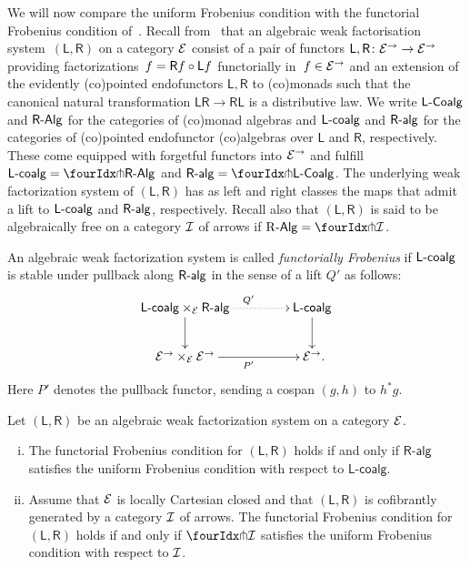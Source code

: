 \documentclass[reqno,10pt,a4paper,oneside,draft]{amsart}
\begin{document}
{
\newcommand{\LL}{\mathsf{L}}
\newcommand{\RR}{\mathsf{R}}

We will now compare the uniform Frobenius condition with the functorial Frobenius condition of~\cite{garner:topological-simplicial}.
Recall from~\cite{bourke-garner-I} that an algebraic weak factorisation system~$(\LL, \RR)$ on a category $\cal{E}$ consist of a pair of functors $\LL, \RR \co \cal{E}^\to \to \cal{E}^\to$ providing factorizations~$f = \RR f \cc \LL f$ functorially in~$f \in \cal{E}^\to$ and an extension of the evidently (co)pointed endofunctors $\LL, \RR$ to (co)monads such that the canonical natural transformation $\LL \RR \to \RR \LL$ is a distributive law.
We write $\pCoalg{\LL}$ and $\pAlg{\RR}$ for the categories of (co)monad algebras and $\pcoalg{\LL}$ and $\palg{\RR}$ for the categories of (co)pointed endofunctor (co)algebras over $\LL$ and $\RR$, respectively.
These come equipped with forgetful functors into $\cal{E}^\to$ and fulfill $\pcoalg{\LL} = \liftl{\pAlg{\RR}}$ and $\palg{\RR} = \liftr{\pCoalg{\LL}}$.
The underlying weak factorization system of $(\LL, \RR)$ has as left and right classes the maps that admit a lift to $\pcoalg{\LL}$ and $\palg{\RR}$, respectively.
Recall also that $(\LL, \RR)$ is said to be algebraically free on a category $\cal{I}$ of arrows if $\pAlg{\R} = \liftr{\cal{I}}$.

\begin{definition} \label{functorial-frobenius}
An algebraic weak factorization system is called \emph{functorially Frobenius} if $\pcoalg{\LL}$ is stable under pullback along $\palg{\RR}$ in the sense of a lift $Q'$ as follows:
\[
\xymatrix@C+2em{
  \pcoalg{\LL} \times_{\cal{E}} \palg{\RR}
  \ar@{.>}[r]^{Q'}
  \ar[d]
&
  \pcoalg{\LL}
  \ar[d]
\\
  \cal{E}^\to \times_{\cal{E}} \cal{E}^\to
  \ar[r]_{P'}
&
  \cal{E}^\to
\rlap{.}}
\]
Here $P'$ denotes the pullback functor, sending a cospan $(g, h)$ to $h^* g$.
\end{definition}

\begin{theorem} \label{thm:frobenius-comparison}
Let $(\mathsf{L}, \mathsf{R})$ be an algebraic weak factorization system on a category $\cal{E}$.
\begin{enumerate}[(i)] 
\item
The functorial Frobenius condition for $(\LL, \RR)$ holds if and only if $\mathsf{R}$-$\mathsf{alg}$ satisfies the uniform Frobenius condition with respect to $\mathsf{L}$-$\mathsf{coalg}$.
\item
Assume that $\cal{E}$ is locally Cartesian closed and that $(\LL, \RR)$ is cofibrantly generated by a category $\cal{I}$ of arrows.
The functorial Frobenius condition for $(\LL, \RR)$ holds if and only if $\liftr{\cal{I}}$ satisfies the uniform Frobenius condition with respect to $\cal{I}$.
\end{enumerate}
\end{theorem} 

}
\end{document}
